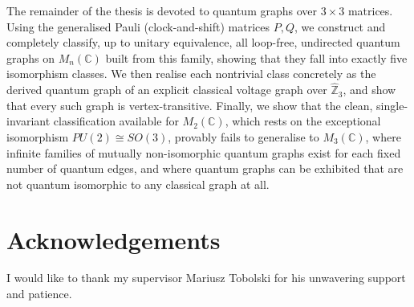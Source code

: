 The remainder of the thesis is devoted to quantum graphs over
\( 3 \times 3 \) matrices. Using the generalised Pauli (clock-and-shift)
matrices \( P, Q \), we construct and completely classify, up to
unitary equivalence, all loop-free, undirected quantum graphs on
\( M_n(\mathbb{C}) \) built from this family, showing that they fall
into exactly
five isomorphism classes. We then realise each nontrivial class
concretely as the derived quantum graph of an explicit classical
voltage graph over \( \widehat{\mathbb{Z}}_3 \), and show that every such graph
is vertex-transitive. Finally, we show that the clean,
single-invariant classification available for \( M_{2}(\mathbb{C})
\), which rests on the exceptional isomorphism \( PU(2) \cong SO(3)
\), provably fails
to generalise to \( M_{3}(\mathbb{C}) \), where infinite families of mutually
non-isomorphic quantum graphs exist for each fixed number of quantum
edges, and where quantum graphs can be exhibited that are not quantum
isomorphic to any classical graph at all.

\section{Acknowledgements}
I would like to thank my supervisor Mariusz Tobolski for his unwavering support
and patience.
